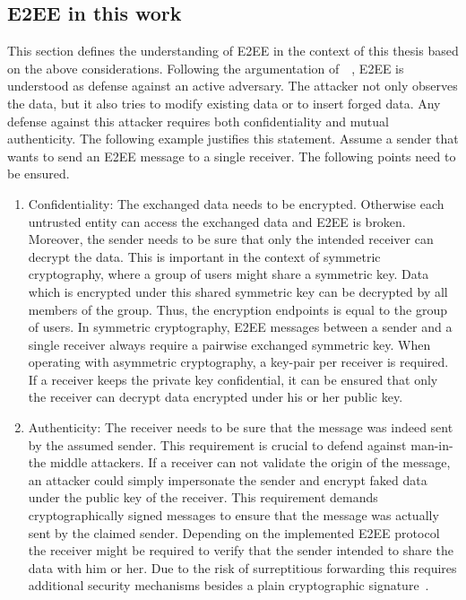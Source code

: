 \documentclass[../main.tex]{subfiles}
\begin{document}
\subsection{E2EE in this work}
This section defines the understanding of E2EE in the context of this thesis based on the above considerations.
Following the argumentation of~\citeauthor{Hale2022}~\cite{Hale2022}, E2EE is understood as defense against an active adversary.
The attacker not only observes the data, but it also tries to modify existing data or to insert forged data.
Any defense against this attacker requires both confidentiality and mutual authenticity.
The following example justifies this statement.
Assume a sender that wants to send an E2EE message to a single receiver.
The following points need to be ensured.
\begin{enumerate}
    \item Confidentiality: 
    The exchanged data needs to be encrypted. Otherwise each untrusted entity can access the exchanged data and E2EE is broken.
    Moreover, the sender needs to be sure that only the intended receiver can decrypt the data. 
    This is important in the context of symmetric cryptography, where a group of users might share a symmetric key.
    Data which is encrypted under this shared symmetric key can be decrypted by all members of the group.
    Thus, the encryption endpoints is equal to the group of users.
    In symmetric cryptography, E2EE messages between a sender and a single receiver always require a pairwise exchanged symmetric key.
    When operating with asymmetric cryptography, a key-pair per receiver is required.
    If a receiver keeps the private key confidential, it can be ensured that only the receiver can decrypt data encrypted under his or her public key.
    \item Authenticity: 
    The receiver needs to be sure that the message was indeed sent by the assumed sender. 
    This requirement is crucial to defend against man-in-the middle attackers.
    If a receiver can not validate the origin of the message, an attacker could simply impersonate the sender and encrypt faked data under the public key of the receiver.
    This requirement demands cryptographically signed messages to ensure that the message was actually sent by the claimed sender.
    Depending on the implemented E2EE protocol the receiver might be required to verify that the sender intended to share the data with him or her.
    Due to the risk of surreptitious forwarding this requires additional security mechanisms besides a plain cryptographic signature~\cite{Davis2001}.
\end{enumerate}
\end{document}
